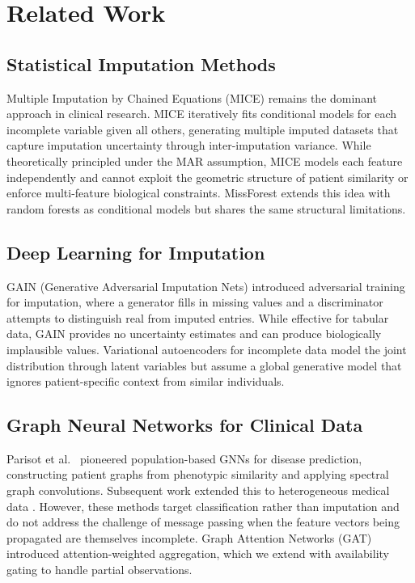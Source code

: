 \documentclass[journal,twoside,web]{ieeecolor}
\begin{document}
\section{Related Work}
\label{sec:related}

\subsection{Statistical Imputation Methods}

Multiple Imputation by Chained Equations (MICE) \cite{vanbuuren2011mice} remains the dominant approach in clinical research. MICE iteratively fits conditional models for each incomplete variable given all others, generating multiple imputed datasets that capture imputation uncertainty through inter-imputation variance. While theoretically principled under the MAR assumption, MICE models each feature independently and cannot exploit the geometric structure of patient similarity or enforce multi-feature biological constraints. MissForest \cite{stekhoven2012missforest} extends this idea with random forests as conditional models but shares the same structural limitations.

\subsection{Deep Learning for Imputation}

GAIN (Generative Adversarial Imputation Nets) \cite{yoon2018gain} introduced adversarial training for imputation, where a generator fills in missing values and a discriminator attempts to distinguish real from imputed entries. While effective for tabular data, GAIN provides no uncertainty estimates and can produce biologically implausible values. Variational autoencoders for incomplete data \cite{ma2019vaem} model the joint distribution through latent variables but assume a global generative model that ignores patient-specific context from similar individuals.

\subsection{Graph Neural Networks for Clinical Data}

Parisot et al.\ \cite{parisot2018disease} pioneered population-based GNNs for disease prediction, constructing patient graphs from phenotypic similarity and applying spectral graph convolutions. Subsequent work extended this to heterogeneous medical data \cite{zitnik2018modeling}. However, these methods target classification rather than imputation and do not address the challenge of message passing when the feature vectors being propagated are themselves incomplete. Graph Attention Networks (GAT) \cite{velickovic2018graph} introduced attention-weighted aggregation, which we extend with availability gating to handle partial observations.
\end{document}
